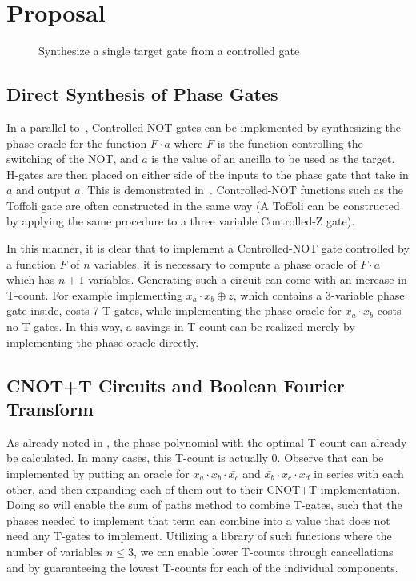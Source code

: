 
\section{Proposal}
\label{Pro}

\begin{figure}[t]
  \centering
  \scalebox{1.0} {
    
  }
  \caption{Synthesize a single target gate from a controlled gate}
  \label{fig-tof}
\end{figure}

\subsection{Direct Synthesis of Phase Gates}
\label{phase-direct}

In a parallel to~, Controlled-NOT gates can be implemented by
synthesizing the phase oracle for the function $F \cdot a$ where $F$ is the function
controlling the switching of the NOT, and $a$ is the value of an ancilla to be used as
the target. H-gates are then placed on either side of the inputs to the phase gate that
take in $a$ and output $a$. This is demonstrated in~. Controlled-NOT
functions such as the Toffoli gate are often constructed in the same way (A Toffoli can
be constructed by applying the same procedure to a three variable Controlled-Z gate).

In this manner, it is clear that to implement a Controlled-NOT gate controlled by a function
$F$ of $n$ variables, it is necessary to compute a phase oracle of $F\cdot a$ which has
$n+1$ variables. Generating such a circuit can come with an increase in T-count. For example
implementing $x_a \cdot x_b \oplus z$, which contains a 3-variable phase gate inside, costs
7 T-gates, while implementing the phase oracle for $x_a \cdot x_b$ costs no T-gates. In this
way, a savings in T-count can be realized merely by implementing the phase oracle
directly.

\subsection{CNOT+T Circuits and Boolean Fourier Transform}
\label{Mot:CNOTBool}

As already noted in , the phase polynomial with the optimal T-count can
already be calculated. In many cases, this T-count is actually 0. Observe that
 can be implemented by putting an oracle for
$x_a \cdot x_b \cdot \bar{x_c}$ and $\bar{x_b} \cdot x_c \cdot x_d$ in series with each
other, and then expanding each of them out to their CNOT+T implementation. Doing so will
enable the sum of paths method to combine T-gates, such that the phases needed to implement
that term can combine into a value that does not need any T-gates to implement. Utilizing a
library of such functions where the number of variables $n \leq 3$, we can enable lower
T-counts through cancellations and by guaranteeing the lowest T-counts for each of the
individual components.


